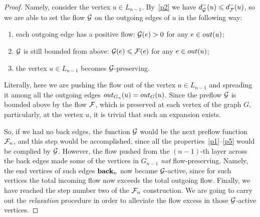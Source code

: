 \documentclass[12pt,oneside,a4paper]{amsart}
\begin{document}
\begin{proof}
        Namely, consider the vertex $u \in L_{n-1}$.
        By~\ref{p2} we have $d_{\cal{G}}^{-}(u) \leq d_{\flowpos}^{-}(u)$,
          so we are able to set the flow $\cal{G}$ on the outgoing edges of $u$ in the following way:
        \begin{enumerate}[label=\textbf{(\roman*)}]
          \item\label{posprop} each outgoing edge has a positive flow: $\cal{G}(e) > 0$ for any $e \in \eout(u)$;
          \item $\cal{G}$ is still bounded from above: $\cal{G}(e) \leq \flowpos(e)$ for any $e \in \eout(u)$;
          \item the vertex $u \in L_{n-1}$ becomes $\cal{G}$-preserving.
        \end{enumerate}
        \begin{remark}
          Literally, here we are pushing the flow out of the vertex $u \in L_{n-1}$ and spreading it among all the outgoing edges
            $\eout_{G_n}(u) = \eout_G(u)$.
          Since the preflow $\cal{G}$ is bounded above by the flow $\flowpos$, which is preserved at each vertex of the graph $G$,
            particularly, at the vertex $u$, it is trivial that such an expansion exists.
        \end{remark}
        So, if we had no back edges, the function $\cal{G}$ would be the next preflow function $\flowposn{n}$, and this step would be accomplished,
          since all the properties~\ref{p1}--\ref{p5} would be complied by $\cal{G}$.
        However, the flow pushed from the $(n-1)$-th layer across the back edges made some of the vertices in $G_{n-1}$ \emph{not} flow-preserving.
        Namely, the end vertices of such edges $\eback_{n}$ now became $\cal{G}$-active, since for such vertices
          the total incoming flow now exceeds the total outgoing flow.
        Finally, we have reached the step number two of the $\flowposn{n}$ construction.
        We are going to carry out the \emph{relaxation} procedure in order to alleviate the flow excess in those $\cal{G}$-active vertices.


\end{proof}
\end{document}
